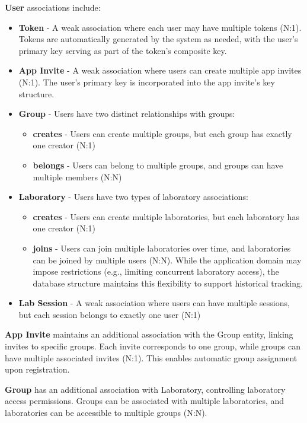 \documentclass[a4paper,twoside,11pt]{article}
\begin{document}
\textbf{User} associations include:
\begin{itemize}
    \item \textbf{Token} - A weak association where each user may have multiple tokens (N:1). Tokens are automatically generated by the system as needed, with the user's primary key serving as part of the token's composite key.
    \item \textbf{App Invite} - A weak association where users can create multiple app invites (N:1). The user's primary key is incorporated into the app invite's key structure.
    \item \textbf{Group} - Users have two distinct relationships with groups:
    \begin{itemize}
        \item \textbf{creates} - Users can create multiple groups, but each group has exactly one creator (N:1)
        \item \textbf{belongs} - Users can belong to multiple groups, and groups can have multiple members (N:N)
    \end{itemize}
    \item \textbf{Laboratory} - Users have two types of laboratory associations:
    \begin{itemize}
        \item \textbf{creates} - Users can create multiple laboratories, but each laboratory has one creator (N:1)
        \item \textbf{joins} - Users can join multiple laboratories over time, and laboratories can be joined by multiple users (N:N). While the application domain may impose restrictions (e.g., limiting concurrent laboratory access), the database structure maintains this flexibility to support historical tracking.
    \end{itemize}
    \item \textbf{Lab Session} - A weak association where users can have multiple sessions, but each session belongs to exactly one user (N:1)
\end{itemize}

\textbf{App Invite} maintains an additional association with the Group entity, linking invites to specific groups. Each invite corresponds to one group, while groups can have multiple associated invites (N:1). This enables automatic group assignment upon registration.

\textbf{Group} has an additional association with Laboratory, controlling laboratory access permissions. Groups can be associated with multiple laboratories, and laboratories can be accessible to multiple groups (N:N).
\end{document}
